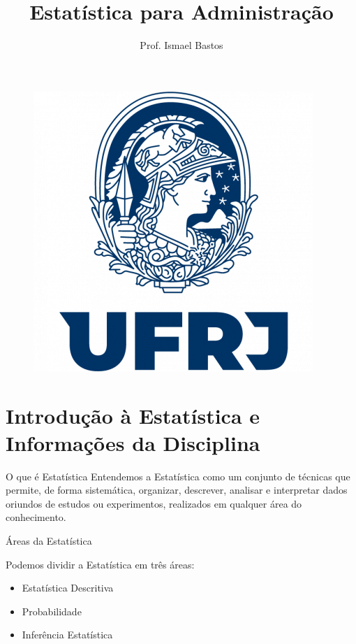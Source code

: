 \documentclass{beamer}
\title{Estatística para Administração}
\author{ Prof. Ismael Bastos}
\date{}
\begin{document}
\begin{frame}
    \titlepage
    \begin{figure}[htpb]
        \begin{center}
            \includegraphics[width=0.25\linewidth]{figures/arbalest.png}
        \end{center}
    \end{figure}
\end{frame}

\section{Introdução à Estatística e Informações da Disciplina}
\begin{frame}{O que é Estatística}
    Entendemos a Estatística como um conjunto de técnicas que permite, de forma sistemática,
organizar, descrever, analisar e interpretar dados oriundos de estudos ou
experimentos, realizados em qualquer área do conhecimento. 
\end{frame}

\begin{frame}{Áreas da Estatística}

Podemos dividir a Estatística em três áreas:
\begin{itemize}
    \item Estatística Descritiva
    \item Probabilidade
    \item Inferência Estatística
\end{itemize}
    
\end{frame}
\end{document}
